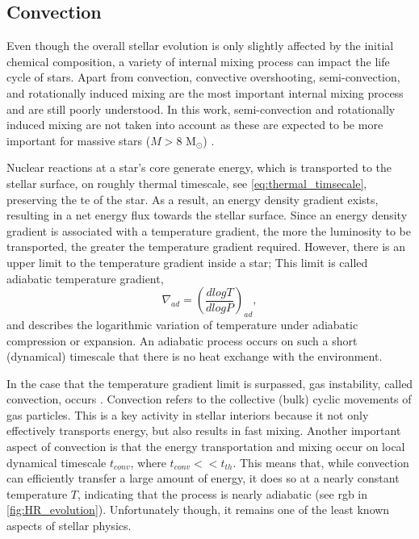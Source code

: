 \subsection{Convection}\label{sec:convection}

Even though the overall stellar evolution is only slightly affected by the initial chemical composition, a variety of internal mixing process can impact the life cycle of stars. Apart from convection, convective overshooting, semi-convection, and rotationally induced mixing are the most important internal mixing process \citep{schootemeijer2019constraining} and are still poorly understood. In this work, semi-convection and rotationally induced mixing are not taken into account as these are expected to be more important for massive stars ($M>8$ M$_{\odot}$) \citep{langer2012presupernova}. 

Nuclear reactions at a star's core generate energy,
which is transported to the stellar surface, on roughly thermal timescale, see \cref{eq:thermal_timsecale}, preserving the \ac{te} of the star. As a result, an energy density gradient exists, resulting in a net energy flux towards the stellar surface. Since an energy density gradient is associated with a temperature gradient, the more the luminosity to be transported, the greater the temperature gradient required. However, there is an upper limit to the temperature gradient inside a star; This limit is called adiabatic temperature gradient,
\begin{equation}\label{eq:ad_tempe_grad}
    \nabla_{ad} = \left ( \frac{d logT}{d logP} \right)_{ad},
\end{equation}
and describes the logarithmic variation of temperature under adiabatic compression or expansion. An adiabatic process occurs on such a short (dynamical) timescale that there is no heat exchange with the environment.

In the case that the temperature gradient limit is surpassed, gas instability, called convection, occurs \citep{pols2011stellar}. Convection refers to the collective (bulk) cyclic movements of gas particles. This is a key activity in stellar interiors because it not only effectively transports energy, but also results in fast mixing. Another important aspect of convection is that the energy transportation and mixing occur on local dynamical timescale $t_{conv}$, where $t_{conv} << t_{th}$. This means that, while convection can efficiently transfer a large amount of energy, it does so at a nearly constant temperature $T$, indicating that the process is nearly adiabatic (see \ac{rgb} in \cref{fig:HR_evolution}). Unfortunately though, it remains one of the least known aspects of stellar physics.

